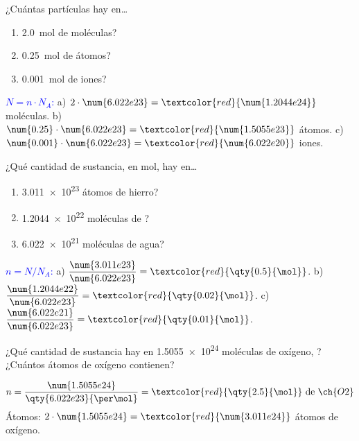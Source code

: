 \begin{exercise}
    ¿Cuántas partículas hay en\ldots
    \begin{enumerate}[label=\alph*)]
        \item \qty{2.0}{\mol} de moléculas?
        \item \qty{0.25}{\mol} de átomos?
        \item \qty{0.001}{\mol} de iones?
    \end{enumerate}
    \begin{solu}
        \textcolor{blue}{\(N = n \cdot N_A\):}
        a) \(2 \cdot \num{6.022e23} = \textcolor{red}{\num{1.2044e24}}\) moléculas. b) \(\num{0.25} \cdot \num{6.022e23} = \textcolor{red}{\num{1.5055e23}}\) átomos. c) \(\num{0.001} \cdot \num{6.022e23} = \textcolor{red}{\num{6.022e20}}\) iones.
    \end{solu}
\end{exercise}

\begin{exercise}
    ¿Qué cantidad de sustancia, en mol, hay en\ldots
    \begin{enumerate}[label=\alph*)]
        \item \num{3.011e23} átomos de hierro?
        \item \num{1.2044e22} moléculas de ?
        \item \num{6.022e21} moléculas de agua?
    \end{enumerate}
    \begin{solu}
        \textcolor{blue}{\(n = N / N_A\):}
        a) \(\dfrac{\num{3.011e23}}{\num{6.022e23}} = \textcolor{red}{\qty{0.5}{\mol}}\). b) \(\dfrac{\num{1.2044e22}}{\num{6.022e23}} = \textcolor{red}{\qty{0.02}{\mol}}\). c) \(\dfrac{\num{6.022e21}}{\num{6.022e23}} = \textcolor{red}{\qty{0.01}{\mol}}\).
    \end{solu}
\end{exercise}

\begin{exercise}
    ¿Qué cantidad de sustancia hay en \num{1.5055e24} moléculas de oxígeno, ? ¿Cuántos átomos de oxígeno contienen?
    \begin{solu}
        \[ n = \frac{\num{1.5055e24}}{\qty{6.022e23}{\per\mol}} = \textcolor{red}{\qty{2.5}{\mol}} \text{ de } \ch{O2} \]
        Átomos: \(2 \cdot \num{1.5055e24} = \textcolor{red}{\num{3.011e24}}\) átomos de oxígeno.
    \end{solu}
\end{exercise}

